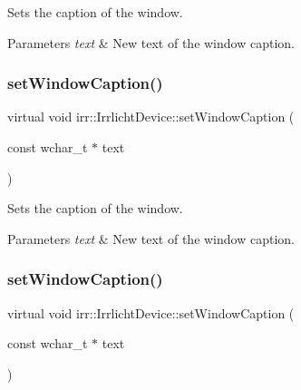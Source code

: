 Sets the caption of the window. 


\begin{DoxyParams}{Parameters}
{\em text} & New text of the window caption. \\
\hline
\end{DoxyParams}
\mbox{\label{classirr_1_1IrrlichtDevice_a3d7c98d520bf18ce1973c6f1439a7c0f}} 
\subsubsection{\texorpdfstring{set\+Window\+Caption()}{setWindowCaption()}\hspace{0.1cm}{\footnotesize\ttfamily [2/3]}}
{\footnotesize\ttfamily virtual void irr\+::\+Irrlicht\+Device\+::set\+Window\+Caption (\begin{DoxyParamCaption}\item[{const wchar\+\_\+t $\ast$}]{text }\end{DoxyParamCaption})\hspace{0.3cm}{\ttfamily [pure virtual]}}



Sets the caption of the window. 


\begin{DoxyParams}{Parameters}
{\em text} & New text of the window caption. \\
\hline
\end{DoxyParams}
\mbox{\label{classirr_1_1IrrlichtDevice_a3d7c98d520bf18ce1973c6f1439a7c0f}} 
\subsubsection{\texorpdfstring{set\+Window\+Caption()}{setWindowCaption()}\hspace{0.1cm}{\footnotesize\ttfamily [3/3]}}
{\footnotesize\ttfamily virtual void irr\+::\+Irrlicht\+Device\+::set\+Window\+Caption (\begin{DoxyParamCaption}\item[{const wchar\+\_\+t $\ast$}]{text }\end{DoxyParamCaption})\hspace{0.3cm}{\ttfamily [pure virtual]}}



